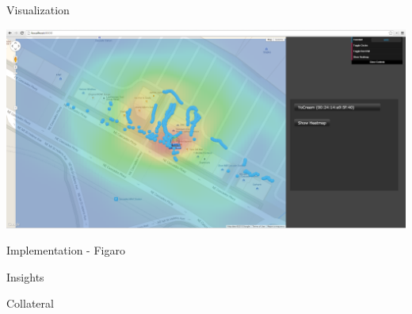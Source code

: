 \documentclass[11pt]{beamer}
\begin{document}
\begin{frame}{Visualization}

\includegraphics[height=0.7\textheight]{pictures/screenshot4.png}
\end{frame}

\begin{frame}{Implementation - Figaro}

\end{frame}

\begin{frame}{Insights}

\end{frame}

\begin{frame}{Collateral}

\end{frame}
\end{document}
